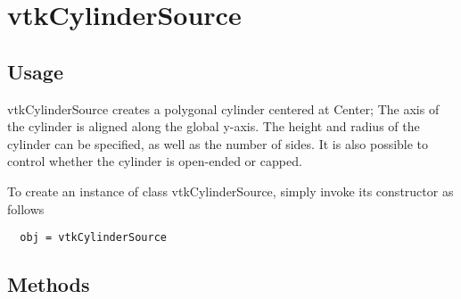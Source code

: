 \section{vtkCylinderSource}

\subsection{Usage}

 vtkCylinderSource creates a polygonal cylinder centered at Center;
 The axis of the cylinder is aligned along the global y-axis.
 The height and radius of the cylinder can be specified, as well as the
 number of sides. It is also possible to control whether the cylinder is
 open-ended or capped.

To create an instance of class vtkCylinderSource, simply
invoke its constructor as follows
\begin{verbatim}
  obj = vtkCylinderSource
\end{verbatim}
\subsection{Methods}

